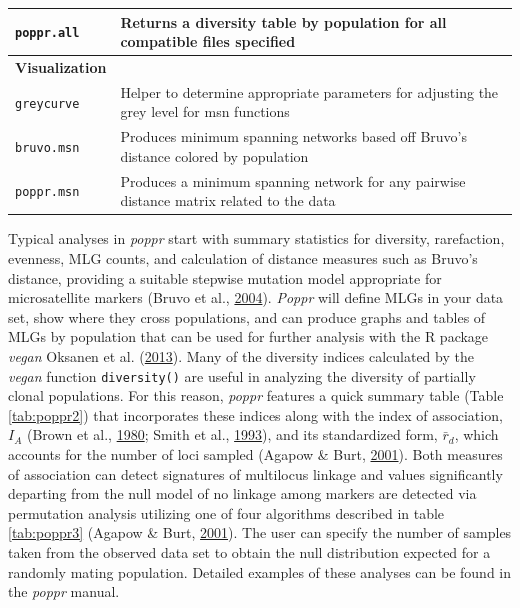 \documentclass[double,11pt]{beavtex}
\begin{document}
\begin{table}
\begin{tabular}{ll}
  \texttt{poppr.all} & Returns a diversity table by population for all compatible files specified \\
  \hline
  \textbf{Visualization} & \\
  \texttt{greycurve} & Helper to determine appropriate parameters for adjusting the grey level for msn functions \\
  \texttt{bruvo.msn} & Produces minimum spanning networks based off Bruvo's distance colored by population \\
  \texttt{poppr.msn} & Produces a minimum spanning network for any pairwise distance matrix related to the data \\
  \hline
  
  \end{tabular}
  \end{table}
  
  Typical analyses in \emph{poppr} start with summary statistics for
  diversity, rarefaction, evenness, MLG counts, and calculation of
  distance measures such as Bruvo's distance, providing a suitable
  stepwise mutation model appropriate for microsatellite markers (Bruvo et
  al., \protect\hyperlink{ref-bruvo2004simple}{2004}). \emph{Poppr} will
  define MLGs in your data set, show where they cross populations, and can
  produce graphs and tables of MLGs by population that can be used for
  further analysis with the R package \emph{vegan} Oksanen et al.
  (\protect\hyperlink{ref-oksanen2013vegan}{2013}). Many of the diversity
  indices calculated by the \emph{vegan} function \texttt{diversity()} are
  useful in analyzing the diversity of partially clonal populations. For
  this reason, \emph{poppr} features a quick summary table (Table
  \ref{tab:poppr2}) that incorporates these indices along with the index
  of association, \(I_A\) (Brown et al.,
  \protect\hyperlink{ref-brown1980multilocus}{1980}; Smith et al.,
  \protect\hyperlink{ref-smith1993how}{1993}), and its standardized form,
  \(\bar{r}_d\), which accounts for the number of loci sampled (Agapow \&
  Burt, \protect\hyperlink{ref-Agapow_2001}{2001}). Both measures of
  association can detect signatures of multilocus linkage and values
  significantly departing from the null model of no linkage among markers
  are detected via permutation analysis utilizing one of four algorithms
  described in table \ref{tab:poppr3} (Agapow \& Burt,
  \protect\hyperlink{ref-Agapow_2001}{2001}). The user can specify the
  number of samples taken from the observed data set to obtain the null
  distribution expected for a randomly mating population. Detailed
  examples of these analyses can be found in the \emph{poppr} manual.
  
\end{document}
